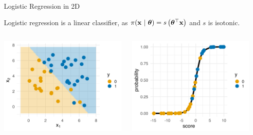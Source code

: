 \documentclass[11pt,compress,t,notes=noshow, xcolor=table]{beamer}
\begin{document}
\begin{vbframe}{Logistic Regression in 2D}

Logistic regression is a linear classifier, as $\pi(\mathbf{x}~|~ \bm{\theta}) = s\left( \bm{\theta}^\top \mathbf{x} \right)$ 
and $s$ is isotonic.

\lz

\begin{columns}[T]
\begin{column}{0.5\textwidth}
  \includegraphics[width=\textwidth]{figure/log_reg-db.png}
\end{column}
\begin{column}{0.5\textwidth}
  \includegraphics[width=\textwidth]{figure/log_reg-scores.png}
\end{column}
\end{columns}

\end{vbframe}

\endlecture
\end{document}
